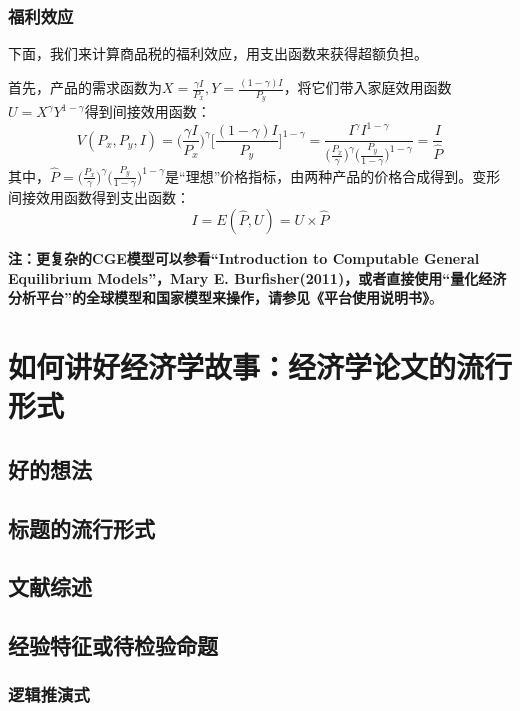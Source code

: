 \documentclass[cn,12pt,math=newtx,citestyle=gb7714-2015,bibstyle=gb7714-2015]{elegantbook}
\begin{document}
	\subsection{福利效应}
	下面，我们来计算商品税的福利效应，用支出函数来获得超额负担。
	
	首先，产品的需求函数为$X=\frac{\gamma I}{P_x},Y=\frac{(1-\gamma)I}{P_y}$，将它们带入家庭效用函数$U=X^{\gamma}Y^{1-\gamma}$得到间接效用函数：
	\begin{equation}
		V(P_x,P_y,I)=\bigg(\frac{\gamma I}{P_x}\bigg)^\gamma\bigg[\frac{(1-\gamma)I}{P_y}\bigg]^{1-\gamma}=\frac{I^\gamma I^{1-\gamma}}{\bigg(\frac{P_x}{\gamma}\bigg)^{\gamma}\bigg(\frac{P_y}{1-\gamma}\bigg)^{1-\gamma}}=\frac{I}{\hat{P}}
	\end{equation}
	其中，$\hat{P}=\bigg(\frac{P_x}{\gamma}\bigg)^{\gamma}\bigg(\frac{P_y}{1-\gamma}\bigg)^{1-\gamma}$是“理想”价格指标，由两种产品的价格合成得到。变形间接效用函数得到支出函数：
	\begin{equation}
		I=E(\hat{P},U)=U\times \hat{P}
	\end{equation}
	
	
	
	
	
	\textbf{注：更复杂的CGE模型可以参看“Introduction to Computable General Equilibrium Models”，Mary E. Burfisher(2011)，或者直接使用“量化经济分析平台”的全球模型和国家模型来操作，请参见《平台使用说明书》}。
	
	
	\chapter{如何讲好经济学故事：经济学论文的流行形式}
	
	\section{好的想法}
	
	\section{标题的流行形式}
	
	\section{文献综述}
	
	\section{经验特征或待检验命题}
	\subsection{逻辑推演式}
	
\end{document}
